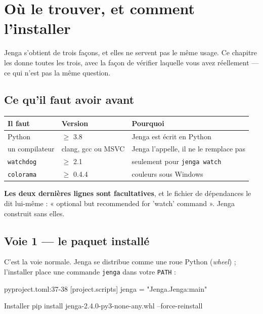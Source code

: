 \chapter{Où le trouver, et comment l'installer}

Jenga s'obtient de trois façons, et elles ne servent pas le même usage. Ce
chapitre les donne toutes les trois, avec la façon de vérifier laquelle vous
avez réellement --- ce qui n'est pas la même question.

\section{Ce qu'il faut avoir avant}

\begin{center}
\begin{tabular}{@{}lll@{}}
\toprule
\textbf{Il faut} & \textbf{Version} & \textbf{Pourquoi} \\
\midrule
Python & $\geq$ 3.8 & Jenga est écrit en Python \\
un compilateur & clang, gcc ou MSVC & Jenga l'appelle, il ne le remplace pas \\
\texttt{watchdog} & $\geq$ 2.1 & seulement pour \texttt{jenga watch} \\
\texttt{colorama} & $\geq$ 0.4.4 & couleurs sous Windows \\
\bottomrule
\end{tabular}
\end{center}

\begin{nkretenir}
\textbf{Les deux dernières lignes sont facultatives}, et le fichier de
dépendances le dit lui-même : « optional but recommended for 'watch' command ».
Jenga construit sans elles.
\end{nkretenir}

\section{Voie 1 --- le paquet installé}

C'est la voie normale. Jenga se distribue comme une roue Python
(\emph{wheel}) ; l'installer place une commande \texttt{jenga} dans votre
\texttt{PATH} :

\begin{nkcode}{pyproject.toml:37-38}
[project.scripts]
jenga = "Jenga.Jenga:main"
\end{nkcode}

\begin{nkcode}{Installer}
pip install jenga-2.4.0-py3-none-any.whl --force-reinstall
\end{nkcode}

